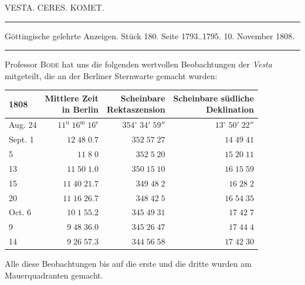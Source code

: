 \clearpage
{}
\begin{center}
VESTA. CERES. KOMET.
\end{center}

\par\vspace{4pt}\hrule\vspace{4pt}
\begin{center}
\fontsize{10}{12}\selectfont Göttingische gelehrte Anzeigen. Stück 180. Seite 1793..1795. 10. November 1808.
\end{center}
\par\vspace{4pt}\hrule\vspace{4pt}

Professor \textsc{Bode} hat uns die folgenden wertvollen Beobachtungen der \emph{Vesta} mitgeteilt, die an der Berliner Sternwarte gemacht wurden:


\begin{center}\fontsize{10}{12}\selectfont\setlength{\tabcolsep}{5pt}\renewcommand{\arraystretch}{1.15}\begin{tabular}{lrrr}
1808 & \shortstack{Mittlere Zeit\\in Berlin} & \shortstack{Scheinbare\\Rektaszension} & \shortstack{Scheinbare südliche\\Deklination}\\
\hline
Aug. 24 & $11^{\text{u}}\;16^{\text{m}}\;16^{\text{s}}$ & $354^\circ\;34'\;59''$ & $13^\circ\;50'\;22''$\\
Sept. 1 & $12\;48\;0.7$ & $352\;57\;27$ & $14\;49\;41$\\
5 & $11\;8\;0$ & $352\;5\;20$ & $15\;20\;11$\\
13 & $11\;50\;1.0$ & $350\;15\;10$ & $16\;15\;59$\\
15 & $11\;40\;21.7$ & $349\;48\;2$ & $16\;28\;2$\\
20 & $11\;16\;26.7$ & $348\;42\;5$ & $16\;54\;35$\\
Oct. 6 & $10\;1\;55.2$ & $345\;49\;31$ & $17\;42\;7$\\
9 & $9\;48\;36.0$ & $345\;26\;47$ & $17\;44\;4$\\
14 & $9\;26\;57.3$ & $344\;56\;58$ & $17\;42\;30$\\
\end{tabular}\end{center}


\par\indent Alle diese Beobachtungen bis auf die erste und die dritte wurden am Mauerquadranten gemacht.

